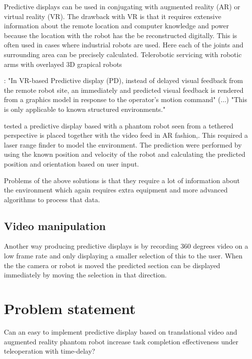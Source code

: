 Predictive displays can be used in conjugating with augmented reality (AR) or virtual reality (VR). The drawback with VR is that it requires extensive information about the remote location and computer knowledge and power because the location with the robot has the be reconstructed digitally. This is often used in cases where industrial robots are used. Here each of the joints and surrounding area can be precisely calculated. Telerobotic servicing with robotic arms with overlayed 3D grapical robots \citep{Kim1993}

\citep{Hu2016}: "In VR-based Predictive display (PD), instead of delayed visual feedback from the remote robot site, an immediately and predicted visual feedback is rendered from a graphics model in response to the operator's motion command" (...) "This is only applicable to known structured environments."

\citep{Ricks2004} tested a predictive display based with a phantom robot seen from a tethered perspective is placed together with the video feed in AR fashion,. This required a laser range finder to model the environment. The prediction were performed by using the known position and velocity of the robot and calculating the predicted position and orientation based on user input.

Problems of the above solutions is that they require a lot of information about the environment which again requires extra equipment and more advanced algorithms to process that data.


\subsection{Video manipulation}

Another way producing predictive displays is by recording 360 degrees video on a low frame rate and only displaying a smaller selection of this to the user. When the the camera or robot is moved the predicted section can be displayed immediately by moving the selection in that direction. \citep{Baldwin1999}


\section{Problem statement}

Can an easy to implement predictive display based on translational video and augmented reality phantom robot increase task completion effectiveness under teleoperation with time-delay?

